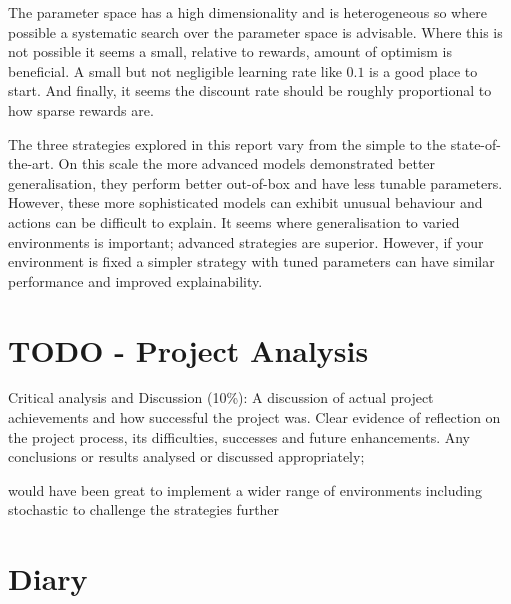\documentclass[]{final_report}
\begin{document}
The parameter space has a high dimensionality and is heterogeneous so where possible a systematic search over the parameter space is advisable. Where this is not possible it seems a small, relative to rewards, amount of optimism is beneficial. A small but not negligible learning rate like $0.1$ is a good place to start. And finally, it seems the discount rate should be roughly proportional to how sparse rewards are. 

The three strategies explored in this report vary from the simple to the state-of-the-art. On this scale the more advanced models demonstrated better generalisation, they perform better out-of-box and have less tunable parameters. However, these more sophisticated models can exhibit unusual behaviour and actions can be difficult to explain. It seems where generalisation to varied environments is important; advanced strategies are superior. However, if your environment is fixed a simpler strategy with tuned parameters can have similar performance and improved explainability.



\chapter{TODO - Project Analysis}

Critical analysis and Discussion (10\%): A discussion of actual project achievements and how successful the project was. Clear evidence of reflection on the project process, its difficulties, successes and future enhancements. Any conclusions or results analysed or discussed appropriately;


would have been great to implement a wider range of environments including stochastic to challenge the strategies further

\newpage




\appendix

\chapter{Diary}

% 



\label{endpage}
\end{document}

